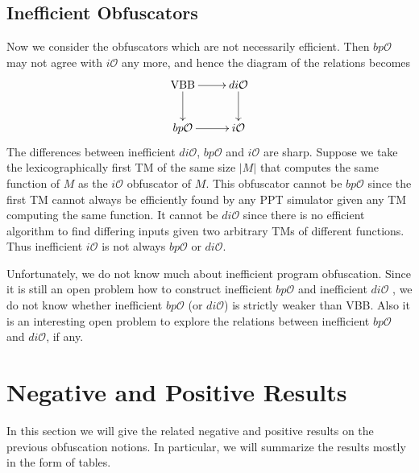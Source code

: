 \documentclass[12pt]{article}
\newcommand{\io}{i\mathcal{O}}
\newcommand{\dio}{di\mathcal{O}}
\newcommand{\bpo}{bp\mathcal{O}}
\theoremstyle{definition}
\begin{document}
\subsection{Inefficient Obfuscators}
Now we consider the obfuscators which are not necessarily efficient. Then $\bpo$ may not agree with $\io$ any more, and hence the diagram of the relations becomes
$$
\xymatrix{
\mathrm{VBB} \ar[r] \ar[d] & \dio \ar[d] \\
\bpo \ar[r] & \io }
$$
The differences between inefficient $\dio$, $\bpo$ and $\io$ are sharp. Suppose we take the lexicographically first TM of the same size $|M|$ that computes the same function of $M$ as the $\io$ obfuscator of $M$. This obfuscator cannot be $\bpo$ since the first TM cannot always be efficiently found by any PPT simulator given any TM computing the same function. It cannot be $\dio$ since there is no efficient algorithm to find differing inputs given two arbitrary TMs of different functions. Thus inefficient $\io$ is not always $\bpo$ or $\dio$.

Unfortunately, we do not know much about inefficient program obfuscation. Since it is still an open problem how to construct inefficient $\bpo$ \cite{goldwasser2014best} and inefficient $\dio$ \cite{garg2014implausibility}, we do not know whether inefficient $\bpo$ (or $\dio$) is strictly weaker than VBB. Also it is an interesting open problem to explore the relations between inefficient $\bpo$ and $\dio$, if any.

\section{Negative and Positive Results}
In this section we will give the related negative and positive results on the previous obfuscation notions. In particular, we will summarize the results mostly in the form of tables.
\end{document}
